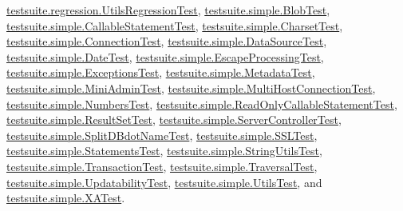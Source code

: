 \mbox{\hyperlink{classtestsuite_1_1regression_1_1_utils_regression_test}{testsuite.\+regression.\+Utils\+Regression\+Test}}, \mbox{\hyperlink{classtestsuite_1_1simple_1_1_blob_test}{testsuite.\+simple.\+Blob\+Test}}, \mbox{\hyperlink{classtestsuite_1_1simple_1_1_callable_statement_test}{testsuite.\+simple.\+Callable\+Statement\+Test}}, \mbox{\hyperlink{classtestsuite_1_1simple_1_1_charset_test}{testsuite.\+simple.\+Charset\+Test}}, \mbox{\hyperlink{classtestsuite_1_1simple_1_1_connection_test}{testsuite.\+simple.\+Connection\+Test}}, \mbox{\hyperlink{classtestsuite_1_1simple_1_1_data_source_test}{testsuite.\+simple.\+Data\+Source\+Test}}, \mbox{\hyperlink{classtestsuite_1_1simple_1_1_date_test}{testsuite.\+simple.\+Date\+Test}}, \mbox{\hyperlink{classtestsuite_1_1simple_1_1_escape_processing_test}{testsuite.\+simple.\+Escape\+Processing\+Test}}, \mbox{\hyperlink{classtestsuite_1_1simple_1_1_exceptions_test}{testsuite.\+simple.\+Exceptions\+Test}}, \mbox{\hyperlink{classtestsuite_1_1simple_1_1_metadata_test}{testsuite.\+simple.\+Metadata\+Test}}, \mbox{\hyperlink{classtestsuite_1_1simple_1_1_mini_admin_test}{testsuite.\+simple.\+Mini\+Admin\+Test}}, \mbox{\hyperlink{classtestsuite_1_1simple_1_1_multi_host_connection_test}{testsuite.\+simple.\+Multi\+Host\+Connection\+Test}}, \mbox{\hyperlink{classtestsuite_1_1simple_1_1_numbers_test}{testsuite.\+simple.\+Numbers\+Test}}, \mbox{\hyperlink{classtestsuite_1_1simple_1_1_read_only_callable_statement_test}{testsuite.\+simple.\+Read\+Only\+Callable\+Statement\+Test}}, \mbox{\hyperlink{classtestsuite_1_1simple_1_1_result_set_test}{testsuite.\+simple.\+Result\+Set\+Test}}, \mbox{\hyperlink{classtestsuite_1_1simple_1_1_server_controller_test}{testsuite.\+simple.\+Server\+Controller\+Test}}, \mbox{\hyperlink{classtestsuite_1_1simple_1_1_split_d_bdot_name_test}{testsuite.\+simple.\+Split\+D\+Bdot\+Name\+Test}}, \mbox{\hyperlink{classtestsuite_1_1simple_1_1_s_s_l_test}{testsuite.\+simple.\+S\+S\+L\+Test}}, \mbox{\hyperlink{classtestsuite_1_1simple_1_1_statements_test}{testsuite.\+simple.\+Statements\+Test}}, \mbox{\hyperlink{classtestsuite_1_1simple_1_1_string_utils_test}{testsuite.\+simple.\+String\+Utils\+Test}}, \mbox{\hyperlink{classtestsuite_1_1simple_1_1_transaction_test}{testsuite.\+simple.\+Transaction\+Test}}, \mbox{\hyperlink{classtestsuite_1_1simple_1_1_traversal_test}{testsuite.\+simple.\+Traversal\+Test}}, \mbox{\hyperlink{classtestsuite_1_1simple_1_1_updatability_test}{testsuite.\+simple.\+Updatability\+Test}}, \mbox{\hyperlink{classtestsuite_1_1simple_1_1_utils_test}{testsuite.\+simple.\+Utils\+Test}}, and \mbox{\hyperlink{classtestsuite_1_1simple_1_1_x_a_test}{testsuite.\+simple.\+X\+A\+Test}}.

